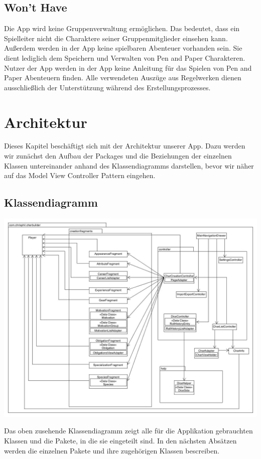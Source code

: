 \subsection{Won't Have}
Die App wird keine Gruppenverwaltung ermöglichen. Das bedeutet, dass ein Spielleiter nicht die Charaktere seiner Gruppenmitglieder einsehen kann. Außerdem werden in der App keine spielbaren Abenteuer vorhanden sein. Sie dient lediglich dem Speichern und Verwalten von Pen and Paper Charakteren. Nutzer der App werden in der App keine Anleitung für das Spielen von Pen and Paper Abenteuern finden. Alle verwendeten Auszüge aus Regelwerken dienen ausschließlich der Unterstützung während des Erstellungsprozesses. 

\newpage
\section{Architektur}
Dieses Kapitel beschäftigt sich mit der Architektur unserer App. Dazu werden wir zunächst den Aufbau der Packages und die Beziehungen der einzelnen Klassen untereinander anhand des Klassendiagramms darstellen, bevor wir näher auf das Model View Controller Pattern eingehen.

\subsection{Klassendiagramm}
\includegraphics[scale=0.35]{images/klassendiagramm.jpg}

Das oben zusehende Klassendiagramm zeigt alle für die Applikation gebrauchten Klassen und die Pakete, in die sie eingeteilt sind. In den nächsten Absätzen werden die einzelnen Pakete und ihre zugehörigen Klassen bescreiben.

